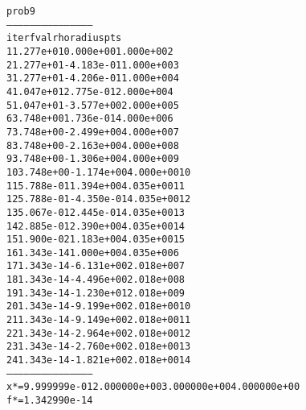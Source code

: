 \begin{alltt}
prob9
---------------------------------------------
iter        fval         rho      radius  pts
   1   1.277e+01   0.000e+00   1.000e+00    2
   2   1.277e+01  -4.183e-01   1.000e+00    3
   3   1.277e+01  -4.206e-01   1.000e+00    4
   4   1.047e+01   2.775e-01   2.000e+00    4
   5   1.047e+01  -3.577e+00   2.000e+00    5
   6   3.748e+00   1.736e-01   4.000e+00    6
   7   3.748e+00  -2.499e+00   4.000e+00    7
   8   3.748e+00  -2.163e+00   4.000e+00    8
   9   3.748e+00  -1.306e+00   4.000e+00    9
  10   3.748e+00  -1.174e+00   4.000e+00   10
  11   5.788e-01   1.394e+00   4.035e+00   11
  12   5.788e-01  -4.350e-01   4.035e+00   12
  13   5.067e-01   2.445e-01   4.035e+00   13
  14   2.885e-01   2.390e+00   4.035e+00   14
  15   1.900e-02   1.183e+00   4.035e+00   15
  16   1.343e-14   1.000e+00   4.035e+00    6
  17   1.343e-14  -6.131e+00   2.018e+00    7
  18   1.343e-14  -4.496e+00   2.018e+00    8
  19   1.343e-14  -1.230e+01   2.018e+00    9
  20   1.343e-14  -9.199e+00   2.018e+00   10
  21   1.343e-14  -9.149e+00   2.018e+00   11
  22   1.343e-14  -2.964e+00   2.018e+00   12
  23   1.343e-14  -2.760e+00   2.018e+00   13
  24   1.343e-14  -1.821e+00   2.018e+00   14
---------------------------------------------
x* = 9.999999e-01  2.000000e+00  3.000000e+00  4.000000e+00  
f* = 1.342990e-14
\end{alltt}
